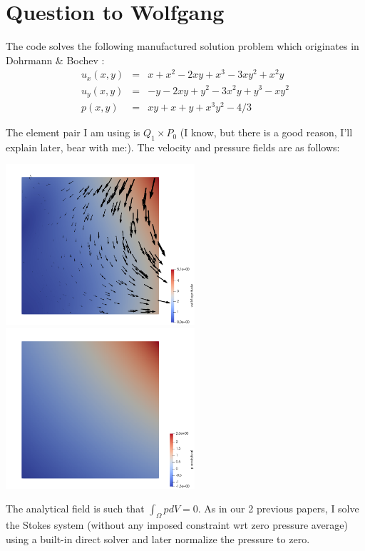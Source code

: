 \documentclass[a4paper,12pt]{article}
\begin{document}
\newpage
\section{Question to Wolfgang}

The code solves the following manufactured solution problem
which originates in Dohrmann \& Bochev \cite{dobo04}: 
\begin{eqnarray}
u_x(x,y) &=& x+x^2 - 2xy+x^3 - 3xy^2 + x^2y \\
u_y(x,y) &=& -y-2xy+y^2 -3x^2y + y^3 - xy^2 \\
p(x,y) &=& xy+x+y+x^3y^2 - 4/3
\end{eqnarray}

The element pair I am using is $Q_1\times P_0$ (I know, but there is a good reason, I'll 
explain later, bear with me:).
The velocity and pressure fields are as follows:

\begin{center}
\includegraphics[width=7cm]{../results/exp09/vel.png}
\includegraphics[width=7cm]{../results/exp09/press.png}
\end{center}

The analytical field is such that $\int_\Omega p dV= 0$.
As in our 2 previous papers, I solve the Stokes system (without 
any imposed constraint wrt zero pressure average) using a built-in direct solver
and later normalize the pressure to zero.
\end{document}
